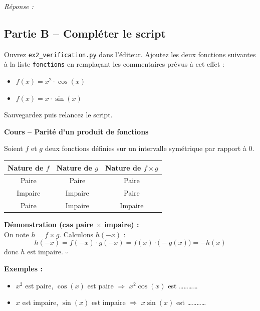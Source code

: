 \documentclass[12pt,a4paper]{article}
\newcommand{\cadreReponse}[1][4]{%
    \begin{mdframed}[backgroundcolor=repbg, linecolor=repframe, linewidth=1pt,
        roundcorner=4pt, innertopmargin=6pt, innerbottommargin=6pt]
    \textcolor{repframe}{\small\textit{Réponse :}}\\[#1\baselineskip]
    \end{mdframed}%
}
\begin{document}
\cadreReponse[4]

\newpage

\subsection{Partie B -- Compléter le script}

\begin{fichierbox}
Ouvrez \texttt{ex2\_verification.py} dans l'éditeur. Ajoutez les deux fonctions suivantes à la liste \texttt{fonctions} en remplaçant les commentaires prévus à cet effet :
\begin{itemize}
    \item $f(x) = x^2 \cdot \cos(x)$
    \item $f(x) = x \cdot \sin(x)$
\end{itemize}
Sauvegardez puis relancez le script.
\end{fichierbox}

\begin{rappelbox}
\textbf{Cours -- Parité d'un produit de fonctions}

\medskip
Soient $f$ et $g$ deux fonctions définies sur un intervalle symétrique par rapport à $0$.

\medskip
\renewcommand{\arraystretch}{1.6}
\begin{center}
\begin{tabular}{|c|c|c|}
    \hline
    \textbf{Nature de $f$} & \textbf{Nature de $g$} & \textbf{Nature de $f \times g$} \\
    \hline
    Paire & Paire & Paire \\
    \hline
    Impaire & Impaire & Paire \\
    \hline
    Paire & Impaire & Impaire \\
    \hline
\end{tabular}
\end{center}

\medskip
\textbf{Démonstration (cas paire $\times$ impaire) :}\\
On note $h = f \times g$. Calculons $h(-x)$ :
\[
    h(-x) = f(-x) \cdot g(-x) = f(x) \cdot \big(-g(x)\big) = -h(x)
\]
donc $h$ est impaire. \hfill $\square$

\medskip
\textbf{Exemples :}
\begin{itemize}
    \item $x^2$ est paire, $\cos(x)$ est paire $\Rightarrow$ $x^2\cos(x)$ est \ldots\ldots\ldots\ldots
    \item $x$ est impaire, $\sin(x)$ est impaire $\Rightarrow$ $x\sin(x)$ est \ldots\ldots\ldots\ldots
\end{itemize}
\end{rappelbox}
\end{document}
